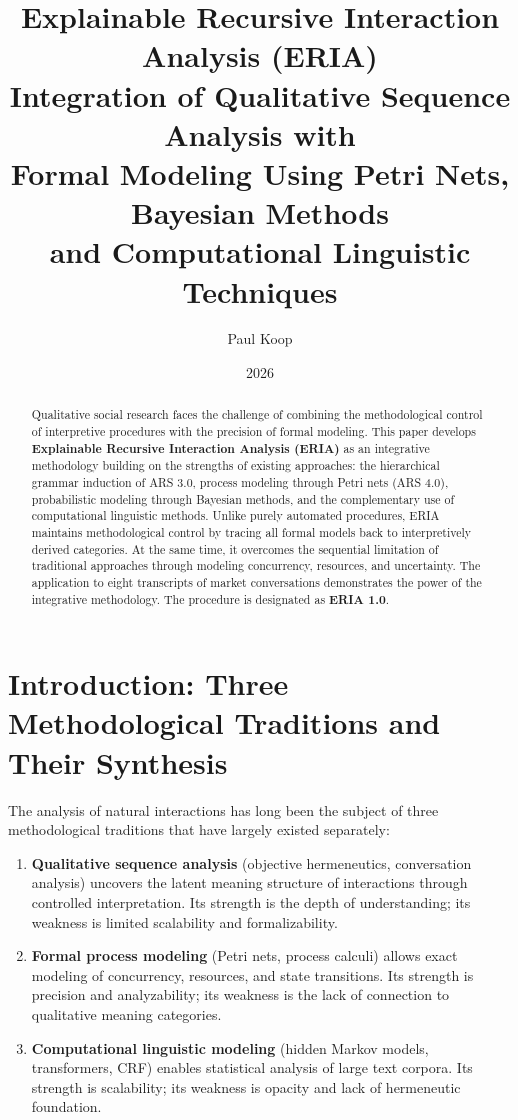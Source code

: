 \documentclass[12pt,a4paper]{article}
\title{\Huge\textbf{Explainable Recursive Interaction Analysis (ERIA)} \\
       \LARGE Integration of Qualitative Sequence Analysis with\\
       \LARGE Formal Modeling Using Petri Nets, Bayesian Methods\\
       \LARGE and Computational Linguistic Techniques}
\author{
  \large
  \begin{tabular}{c}
    Paul Koop
  \end{tabular}
}
\date{\large 2026}
\begin{document}
\maketitle

\begin{abstract}
Qualitative social research faces the challenge of combining the methodological control of interpretive procedures with the precision of formal modeling. This paper develops \textbf{Explainable Recursive Interaction Analysis (ERIA)} as an integrative methodology building on the strengths of existing approaches: the hierarchical grammar induction of ARS 3.0, process modeling through Petri nets (ARS 4.0), probabilistic modeling through Bayesian methods, and the complementary use of computational linguistic methods. Unlike purely automated procedures, ERIA maintains methodological control by tracing all formal models back to interpretively derived categories. At the same time, it overcomes the sequential limitation of traditional approaches through modeling concurrency, resources, and uncertainty. The application to eight transcripts of market conversations demonstrates the power of the integrative methodology. The procedure is designated as \textbf{ERIA 1.0}.
\end{abstract}

\newpage
\tableofcontents
\newpage

\section{Introduction: Three Methodological Traditions and Their Synthesis}

The analysis of natural interactions has long been the subject of three methodological traditions that have largely existed separately:

\begin{enumerate}
    \item \textbf{Qualitative sequence analysis} (objective hermeneutics, conversation analysis) uncovers the latent meaning structure of interactions through controlled interpretation. Its strength is the depth of understanding; its weakness is limited scalability and formalizability.
    
    \item \textbf{Formal process modeling} (Petri nets, process calculi) allows exact modeling of concurrency, resources, and state transitions. Its strength is precision and analyzability; its weakness is the lack of connection to qualitative meaning categories.
    
    \item \textbf{Computational linguistic modeling} (hidden Markov models, transformers, CRF) enables statistical analysis of large text corpora. Its strength is scalability; its weakness is opacity and lack of hermeneutic foundation.
\end{enumerate}
\end{document}

